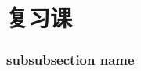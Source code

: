 \documentclass[hidelinks]{ctexart}
\begin{document}
\section{复习课} %
\label{sec:复习课}

\subsubsection{subsubsection name} %
\label{ssub:subsubsection_name}


\end{document}
